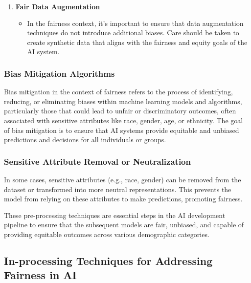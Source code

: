 \documentclass[12pt,a4paper,openright,twoside]{book}
\begin{document}
\begin{enumerate}
\begin{itemize}
    \end{itemize}
    
    \item \textbf{Fair Data Augmentation}
    
    \begin{itemize}
    
        \item In the fairness context, it's important to ensure that data augmentation techniques do not introduce additional biases. Care should be taken to create synthetic data that aligns with the fairness and equity goals of the AI system. \cite{10.1145/3531146.3534644}
    
    \end{itemize}

\end{enumerate}

\subsubsection{Bias Mitigation Algorithms}

Bias mitigation in the context of fairness refers to the process of identifying, reducing, or eliminating biases within machine learning models and algorithms, particularly those that could lead to unfair or discriminatory outcomes, often associated with sensitive attributes like race, gender, age, or ethnicity. The goal of bias mitigation is to ensure that AI systems provide equitable and unbiased predictions and decisions for all individuals or groups.

\subsubsection{Sensitive Attribute Removal or Neutralization}

In some cases, sensitive attributes (e.g., race, gender) can be removed from the dataset or transformed into more neutral representations. This prevents the model from relying on these attributes to make predictions, promoting fairness. \cite{NEURIPS2021_64ff7983}

These pre-processing techniques are essential steps in the AI development pipeline to ensure that the subsequent models are fair, unbiased, and capable of providing equitable outcomes across various demographic categories.

\subsection{In-processing Techniques for Addressing Fairness in AI}
\end{document}

